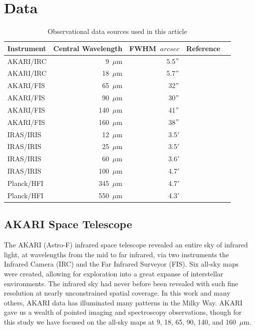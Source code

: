 \chapter{Data
  \label{chap:Data}}
\begin{table}[ht]
\label{datasources}
\caption{Observational data sources used in this article}
\centering
\begin{tabular}{lrrrr}
\toprule
Instrument    & Central Wavelength & FWHM~$arcsec$ & Reference  \\
\midrule
AKARI/IRC & 9~$\mu$m     & 5.5$"$	     & \citep{irc07,ishihara10}  \\
AKARI/IRC & 18~$\mu$m	 & 5.7$"$       & \citep{irc07,ishihara10}   \\
AKARI/FIS & 65~$\mu$m    & 32$"$     & \citep{fis07,doi12} \\
AKARI/FIS & 90~$\mu$m    & 30$"$     & \citep{fis07,doi12} \\
AKARI/FIS & 140~$\mu$m	 & 41$"$     & \citep{fis07,doi12} \\
AKARI/FIS & 160~$\mu$m	 & 38$"$     & \citep{fis07,doi12}             \\ 
IRAS/IRIS & 12~$\mu$m    & 3.5$'$          & \citep{iris05}             \\
IRAS/IRIS & 25~$\mu$m    & 3.5$'$          & \citep{iris05}             \\
IRAS/IRIS & 60~$\mu$m    & 3.6$'$          & \citep{iris05}              \\
IRAS/IRIS & 100~$\mu$m   & 4.7$'$          & \citep{iris05}         \\
Planck/HFI & 345~$\mu$m & 4.7$'$ & \citep{hfi14viii} \\
Planck/HFI & 550~$\mu$m & 4.3$'$& \citep{hfi14viii} \\
\bottomrule
\end{tabular}
\end{table}
\section{AKARI Space Telescope}
     The AKARI (Astro-F) infrared space telescope revealed an entire sky of infrared light, at wavelengths from the mid to far infrared, via two instruments \citep{akari07} the Infrared Camera (IRC)\citep{irc07} and the Far Infrared Surveyor (FIS)\citep{fis07}. Six all-sky maps were created, allowing for exploration into a great expanse of interstellar environments. The infrared sky had never before been revealed with such fine resolution at nearly unconstrained spatial coverage. In this work and many others, AKARI data has illuminated many patterns in the Milky Way. AKARI gave us a wealth of pointed imaging and spectroscopy observations, though for this study we have focused on the all-sky maps at 9, 18, 65, 90, 140, and 160~$\mu$m.

